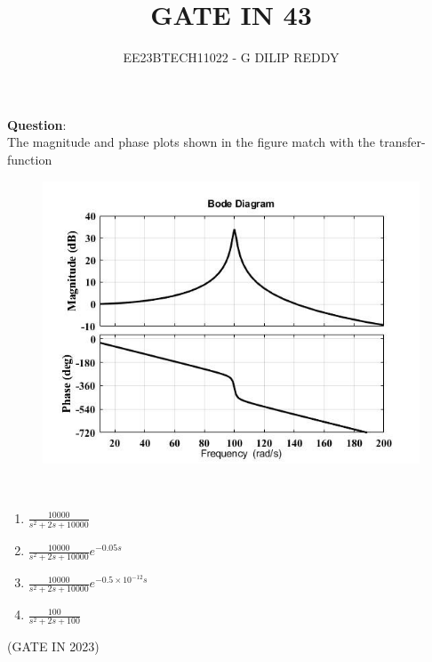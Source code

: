 \documentclass[journal,12pt,twocolumn]{IEEEtran}
\theoremstyle{remark}
\begin{document}

\vspace{3cm}

\title{GATE IN 43}
\author{EE23BTECH11022 - G DILIP REDDY}
\maketitle
\newpage

\bigskip

\renewcommand{\thefigure}{\arabic{figure}}
\renewcommand{\thetable}{\arabic{table}}
\textbf{Question}:\\
The magnitude and phase plots shown in the figure match with the transfer-
function
\begin{figure}[h]
    \centering
    \includegraphics[width=1.1\linewidth]{figs/question.png}
\end{figure}\\
\begin{enumerate}
\item $\frac{10000}{s^2+2s+10000}$\\
\item $\frac{10000}{s^2+2s+10000}e^{-0.05s}$\\
\item $\frac{10000}{s^2+2s+10000}e^{-0.5\times10^{-12}s}$\\
\item $\frac{100}{s^2+2s+100}$
\end{enumerate}
\hfill{(GATE IN 2023)}
\\\\
\solution
\end{document}
